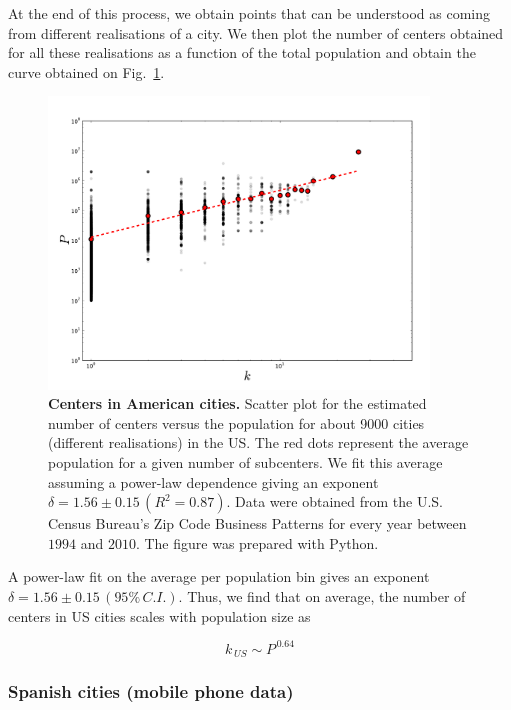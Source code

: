 At the end of this process, we obtain points that can be understood as coming
from different realisations of a city. We then plot the number of centers
obtained for all these realisations as a function of the total population and
obtain the curve obtained on Fig.~\ref{fig:us_centers}.

\begin{figure}
    \centering
    \includegraphics[width=0.9\textwidth]{gfx/chapter-monocentric/us_num-centers.pdf}
    \caption{{\bf Centers in American cities.} Scatter plot for the estimated number of centers versus the
    population for about 9000 cities (different realisations) in the US. The red
dots represent the average population for a given number of subcenters. We fit
this average assuming a power-law dependence giving an exponent $\delta = 1.56
    \pm 0.15\,(R^2=0.87)$. Data were obtained from the U.S. Census Bureau's Zip
Code Business Patterns for every year between $1994$ and $2010$. The figure was
prepared with Python.\label{fig:us_centers}}
\end{figure}


A power-law fit on the average per population bin gives an exponent $\delta =
1.56 \pm 0.15\,(95\%\,C.I.)$. Thus, we find that on average, the number of
centers in US cities scales with population size as

\begin{equation}
    k_{\,US} \sim P^{\,0.64}
\end{equation}

\subsubsection{Spanish cities (mobile phone data)}
\label{sub:spanish_cities_mobile_phone_data_}

